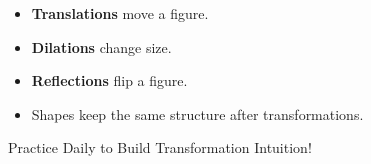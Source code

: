 \documentclass[11pt]{article}
\begin{document}
\vspace{0.5cm}


\begin{tcolorbox}[colback=orange!5,colframe=orange,title=\Large Visual Summary]

\begin{itemize}
    \item \textbf{Translations} move a figure.
    \item \textbf{Dilations} change size.
    \item \textbf{Reflections} flip a figure.
    \item Shapes keep the same structure after transformations.
\end{itemize}

\vspace{0.2cm}

\begin{center}
\Large
Practice Daily to Build Transformation Intuition!
\end{center}

\end{tcolorbox}
\end{document}
